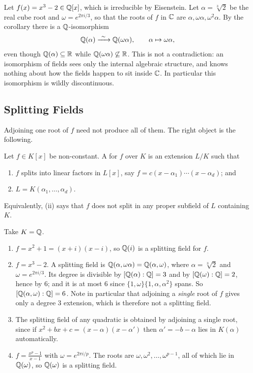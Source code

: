 \documentclass[a4paper]{scrartcl}
\begin{document}
\begin{example}
	Let $f(x) = x^3 - 2 \in \mathbb{Q}[x]$, which is irreducible by Eisenstein. Let $\alpha = \sqrt[3]2$ be the real cube root and $\omega = e^{2\pi i /3}$, so that the roots of $f$ in $\mathbb{C}$ are $\alpha, \omega\alpha, \omega^2\alpha$. By the corollary there is a $\mathbb{Q}$-isomorphism
	$$\mathbb{Q}(\alpha) \xrightarrow{\ \sim\ } \mathbb{Q}(\omega\alpha), \qquad \alpha \mapsto \omega\alpha,$$
	even though $\mathbb{Q}(\alpha) \subseteq \mathbb{R}$ while $\mathbb{Q}(\omega\alpha) \not\subseteq \mathbb{R}$. This is not a contradiction: an isomorphism of fields sees only the internal algebraic structure, and knows nothing about how the fields happen to sit inside $\mathbb{C}$. In particular this isomorphism is wildly discontinuous.
\end{example}

\subsection{Splitting Fields}

Adjoining one root of $f$ need not produce all of them. The right object is the following.

\begin{definition}
	Let $f \in K[x]$ be non-constant. A  for $f$ over $K$ is an extension $L/K$ such that
	\begin{enumerate}[label=(\roman*)]
		\item $f$ splits into linear factors in $L[x]$, say $f = c(x-\alpha_1)\cdots(x-\alpha_d)$; and
		\item $L = K(\alpha_1, \dots, \alpha_d)$.
	\end{enumerate}
	Equivalently, (ii) says that $f$ does not split in any proper subfield of $L$ containing $K$.
\end{definition}

\begin{example}
	Take $K = \mathbb{Q}$.
	\begin{enumerate}[label=(\roman*)]
		\item $f = x^2 + 1 = (x+i)(x-i)$, so $\mathbb{Q}(i)$ is a splitting field for $f$.
		\item $f = x^3 - 2$. A splitting field is $\mathbb{Q}(\alpha, \omega\alpha) = \mathbb{Q}(\alpha, \omega)$, where $\alpha = \sqrt[3]2$ and $\omega = e^{2\pi i /3}$. Its degree is divisible by $[\mathbb{Q}(\alpha):\mathbb{Q}] = 3$ and by $[\mathbb{Q}(\omega):\mathbb{Q}] = 2$, hence by $6$; and it is at most $6$ since $\{1,\omega\}\{1,\alpha,\alpha^2\}$ spans. So $[\mathbb{Q}(\alpha,\omega):\mathbb{Q}] = 6$. Note in particular that adjoining a \emph{single} root of $f$ gives only a degree $3$ extension, which is therefore not a splitting field.
		\item The splitting field of any quadratic is obtained by adjoining a single root, since if $x^2+bx+c = (x-\alpha)(x-\alpha')$ then $\alpha' = -b-\alpha$ lies in $K(\alpha)$ automatically.
		\item $f = \frac{x^p-1}{x-1}$ with $\omega = e^{2\pi i /p}$. The roots are $\omega, \omega^2, \dots, \omega^{p-1}$, all of which lie in $\mathbb{Q}(\omega)$, so $\mathbb{Q}(\omega)$ is a splitting field.
	\end{enumerate}
\end{example}
\end{document}
